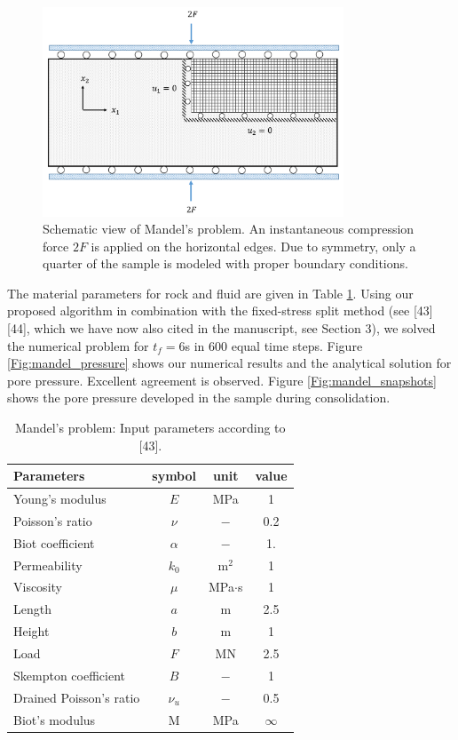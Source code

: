 \documentclass{elsarticle}
\begin{document}
	\begin{figure}[htbp]
		\centering
		\includegraphics[width=0.8\textwidth]{MANDEL}
		\caption{Schematic view of Mandel's problem. An instantaneous compression force $2F$ is applied on the horizontal edges. Due to symmetry, only a quarter of the sample is modeled with proper boundary conditions.}
		\label{Fig:mandel}
	\end{figure}
	
	
	The material parameters for rock and fluid are given in Table \ref{Tab:Mandel_input}. Using our proposed algorithm in combination with the fixed-stress split method (see [43][44], which we have now also cited in the manuscript, see Section 3), we solved the numerical problem for $t_f=6$s in 600 equal time steps. Figure \ref{Fig:mandel_pressure} shows our numerical results and the analytical solution for pore pressure. Excellent agreement is observed. Figure \ref{Fig:mandel_snapshots} shows the pore pressure developed in the sample during consolidation.
	
		\begin{table}[htbp]
		\centering
		\caption{Mandel's problem: Input parameters according to [43].}
		\begin{tabular}{l c c c}
			\hline 
			Parameters & symbol & unit& value \\
			\hline 
			Young's modulus & $E$ &MPa&  1\\
			Poisson's ratio & $\nu$ &$-$&  0.2\\
			Biot coefficient & $\alpha$ &$-$&  1.\\
			Permeability & $k_0$ &m$^2$&  1\\
			Viscosity &$\mu$ & MPa$\cdot$s &  1\\
			Length & $a$ & m &  2.5\\
			Height & $b$ & m &  1\\
			Load&$F$& MN& 2.5\\     
			Skempton coefficient &$B$& $-$& 1\\                    
			Drained Poisson's ratio&$\nu_u$& $-$&  0.5\\      
			Biot's modulus  & M & MPa & $\infty$ \\                                               
			\hline      
		\end{tabular}
		\label{Tab:Mandel_input}
	\end{table}
	
\end{document}
